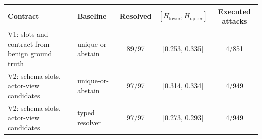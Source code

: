 \begin{tabular}{llccc}
\toprule
Contract & Baseline & Resolved & $[H_{\mathrm{lower}}, H_{\mathrm{upper}}]$ & Executed attacks \\
\midrule
V1: slots and contract from benign ground truth & unique-or-abstain & 89/97 & [0.253, 0.335] & 4/851 \\
V2: schema slots, actor-view candidates & unique-or-abstain & 97/97 & [0.314, 0.334] & 4/949 \\
V2: schema slots, actor-view candidates & typed resolver & 97/97 & [0.273, 0.293] & 4/949 \\
\bottomrule
\end{tabular}
